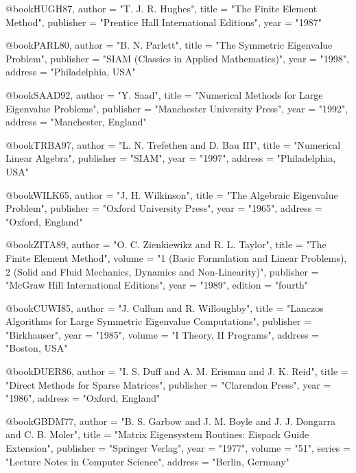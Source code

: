 @book{HUGH87,
   author       = "T. J. R. Hughes",
   title        = "The Finite Element Method",
   publisher    = "Prentice Hall International Editions",
   year         = "1987"}

@book{PARL80,
   author       = "B. N. Parlett",
   title        = "The Symmetric Eigenvalue Problem",
   publisher    = "SIAM (Classics in Applied Mathematics)",
   year         = "1998",
   address      = "Philadelphia, USA"}

@book{SAAD92,
   author       = "Y. Saad",
   title        = "Numerical Methods for Large Eigenvalue Problems",
   publisher    = "Manchester University Press",
   year         = "1992",
   address      = "Manchester, England"}

@book{TRBA97,
   author       = "L. N. Trefethen and D. Bau III",
   title        = "Numerical Linear Algebra",
   publisher    = "SIAM",
   year         = "1997",
   address      = "Philadelphia, USA"}

@book{WILK65,
   author       = "J. H. Wilkinson",
   title        = "The Algebraic Eigenvalue Problem",
   publisher    = "Oxford University Press",
   year         = "1965",
   address      = "Oxford, England"}

@book{ZITA89,
   author       = "O. C. Zienkiewikz and R. L. Taylor",
   title        = "The Finite Element Method",
   volume       = "1 (Basic Formulation and Linear Problems),
                   2 (Solid and Fluid Mechanics,
                      Dynamics and Non-Linearity)",
   publisher    = "McGraw Hill International Editions",
   year         = "1989",
   edition      = "fourth"}


@book{CUWI85,
   author       = "J. Cullum and R. Willoughby",
   title        = "Lanczos Algorithms for Large Symmetric
                   Eigenvalue Computations",
   publisher    = "Birkhauser",
   year         = "1985",
   volume       = "I Theory, II Programs",
   address      = "Boston, USA"}

@book{DUER86,
   author       = "I. S. Duff and A. M. Erisman and J. K. Reid",
   title        = "Direct Methods for Sparse Matrices",
   publisher    = "Clarendon Press",
   year         = "1986",
   address      = "Oxford, England"}

@book{GBDM77,
   author       = "B. S. Garbow and J. M. Boyle and J. J. Dongarra
                   and C. B. Moler",
   title        = "{Matrix Eigensystem Routines: Eispack
                   Guide Extension}",
   publisher    = "Springer Verlag",
   year         = "1977",
   volume       = "51",
   series       = "Lecture Notes in Computer Science",
   address      = "Berlin, Germany"}

